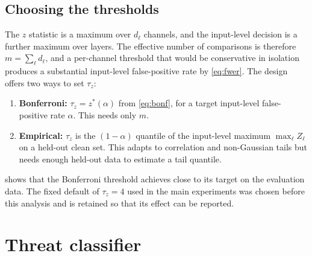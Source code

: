\subsection{Choosing the thresholds}
\label{sec:design:threshold}

The $z$ statistic is a maximum over $d_\ell$ channels, and the input-level decision is a further
maximum over layers. The effective number of comparisons is therefore $m=\sum_\ell d_\ell$, and a
per-channel threshold that would be conservative in isolation produces a substantial input-level
false-positive rate by \cref{eq:fwer}. The design offers two ways to set $\tau_z$:

\begin{enumerate}[leftmargin=*]
  \item \textbf{Bonferroni:} $\tau_z = z^*(\alpha)$ from \cref{eq:bonf}, for a target input-level
        false-positive rate $\alpha$. This needs only $m$.
  \item \textbf{Empirical:} $\tau_z$ is the $(1-\alpha)$ quantile of the input-level maximum
        $\max_\ell Z_\ell$ on a held-out clean set. This adapts to correlation and non-Gaussian
        tails but needs enough held-out data to estimate a tail quantile.
\end{enumerate}

 shows that the Bonferroni threshold achieves close to its target on the
evaluation data. The fixed default of $\tau_z=4$ used in the main experiments was chosen before
this analysis and is retained so that its effect can be reported.

\section{Threat classifier}
\label{sec:design:classifier}

